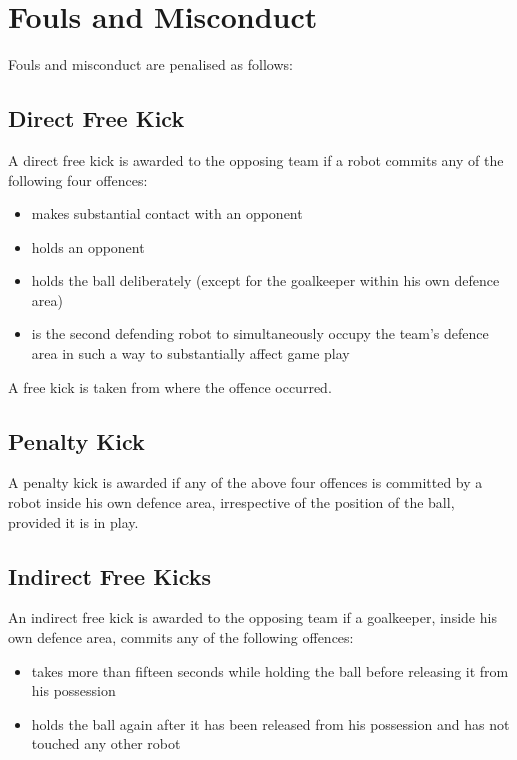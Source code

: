 \section{Fouls and Misconduct}\label{sec:fouls-and-misconduct}

Fouls and misconduct are penalised as follows:

\subsection{Direct Free Kick}
A direct free kick is awarded to the opposing team if a robot commits any of the following four offences:
\begin{itemize}
\item makes substantial contact with an opponent
\item holds an opponent
\item holds the ball deliberately (except for the goalkeeper within his own defence area)
\item is the second defending robot to simultaneously occupy the team's defence area in such a way to substantially affect game play
\end{itemize}

A free kick is taken from where the offence occurred.

\subsection{Penalty Kick}
A penalty kick is awarded if any of the above four offences is committed by a robot inside his own defence area, irrespective of the position of the ball, provided it is in play.

\subsection{Indirect Free Kicks}
An indirect free kick is awarded to the opposing team if a goalkeeper, inside his own defence area, commits any of the following offences:
\begin{itemize}
\item takes more than fifteen seconds while holding the ball before releasing it from his possession
\item holds the ball again after it has been released from his possession and has not touched any other robot
\end{itemize}

